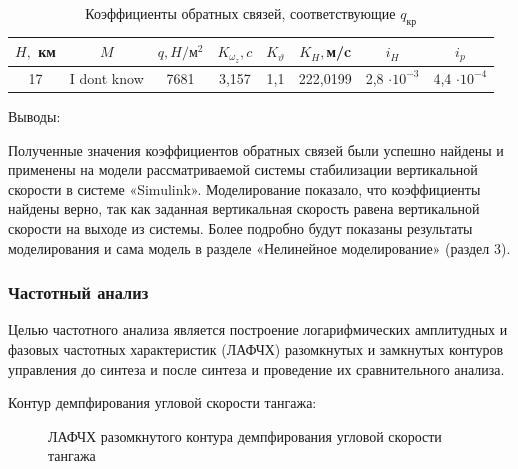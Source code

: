 \begin{table}[H]
    \centering
    \caption{Коэффициенты обратных связей, соответствующие $q_\text{кр}$}
    \begin{tabular}{|c|c|c|c|c|c|c|c|}
    \hline
        $H,$ км & $M$ & $q, H / \text{м}^2$ & $K_{\omega_z}, c$ & $K_\vartheta$ & $K_H,$м/c &$i_H$&$i_p$ \\ \hline
        17&I dont know&7681 &3,157 & 1,1 &222,0199 &2,8 $\cdot 10^{-3}$&4,4 $\cdot 10^{-4}$\\ \hline
    \end{tabular}
    \label{tab:q_kr}
\end{table}

\begin{center}
    Выводы:
\end{center}

Полученные значения коэффициентов обратных связей были успешно найдены и применены на модели рассматриваемой системы стабилизации вертикальной скорости в системе «Simulink». Моделирование показало, что коэффициенты найдены верно, так как заданная вертикальная скорость равена вертикальной скорости на выходе из системы. Более подробно будут показаны результаты моделирования и сама модель в разделе «Нелинейное моделирование» (раздел 3).

\subsubsection{Частотный анализ}

Целью частотного анализа является построение логарифмических амплитудных и фазовых частотных характеристик (ЛАФЧХ) разомкнутых и замкнутых контуров управления до синтеза и после синтеза и проведение их сравнительного анализа.

\begin{center}
    Контур демпфирования угловой скорости тангажа:
\end{center}

\begin{figure}[H]
    \caption{ЛАФЧХ разомкнутого контура демпфирования угловой скорости тангажа}
    \label{fig:Угловая скорость тангажа раз qMIN}
\end{figure}

